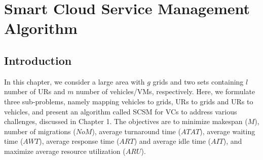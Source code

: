 \chapter{Smart Cloud Service Management Algorithm}
\section{Introduction}
In this chapter, we consider a large area with $g$ grids and two sets containing $l$ number of URs and $m$ number of vehicles/VMs, respectively. Here, we formulate three sub-problems, namely mapping vehicles to grids, URs to grids and URs to vehicles, and present an algorithm called SCSM for VCs to address various challenges, discussed in Chapter 1. The objectives are to minimize makespan ($M$), number of migrations ($NoM$), average turnaround time ($ATAT$), average waiting time ($AWT$), average response time ($ART$) and average idle time ($AIT$), and maximize average resource utilization ($ARU$).
